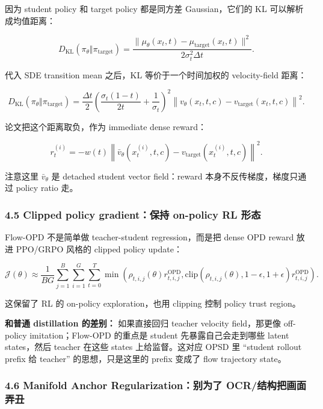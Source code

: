 因为 student policy 和 target policy 都是同方差 Gaussian，它们的 KL 可以解析成均值距离：

\[
D_{\mathrm{KL}}(\pi_\theta\Vert\pi_{\mathrm{target}})
=
\frac{\|\mu_\theta(x_t,t)-\mu_{\mathrm{target}}(x_t,t)\|^2}{2\sigma_t^2\Delta t}.
\]

代入 SDE transition mean 之后，KL 等价于一个时间加权的 velocity-field 距离：

\[
D_{\mathrm{KL}}(\pi_\theta\Vert\pi_{\mathrm{target}})
=
\frac{\Delta t}{2}
\left(
\frac{\sigma_t(1-t)}{2t}+\frac{1}{\sigma_t}
\right)^2
\left\|v_\theta(x_t,t,c)-v_{\mathrm{target}}(x_t,t,c)\right\|^2.
\]

论文把这个距离取负，作为 immediate dense reward：

\[
r_t^{(i)}
=
-w(t)
\left\|
\bar{v}_\theta(x_t^{(i)},t,c)-v_{\mathrm{target}}(x_t^{(i)},t,c)
\right\|^2.
\]

注意这里 $\bar{v}_\theta$ 是 detached student vector field：reward 本身不反传梯度，梯度只通过 policy ratio 走。

\subsubsection{4.5 Clipped policy gradient：保持 on-policy RL 形态}

Flow-OPD 不是简单做 teacher-student regression，而是把 dense OPD reward 放进 PPO/GRPO 风格的 clipped policy update：

\[
\mathcal{J}(\theta)
\approx
\frac{1}{BG}
\sum_{j=1}^{B}\sum_{i=1}^{G}\sum_{t=0}^{T}
\min\left(
\rho_{t,i,j}(\theta)r_{t,i,j}^{\mathrm{OPD}},
\mathrm{clip}\left(\rho_{t,i,j}(\theta),1-\epsilon,1+\epsilon\right)
r_{t,i,j}^{\mathrm{OPD}}
\right).
\]

这保留了 RL 的 on-policy exploration，也用 clipping 控制 policy trust region。

\begin{summarybox}
\textbf{和普通 distillation 的差别：} 如果直接回归 teacher velocity field，那更像 off-policy imitation；Flow-OPD 的重点是 student 先暴露自己会走到哪些 latent states，然后 teacher 在这些 states 上给监督。这对应 OPSD 里 ``student rollout prefix 给 teacher'' 的思想，只是这里的 prefix 变成了 flow trajectory state。
\end{summarybox}

\subsubsection{4.6 Manifold Anchor Regularization：别为了 OCR/结构把画面弄丑}

